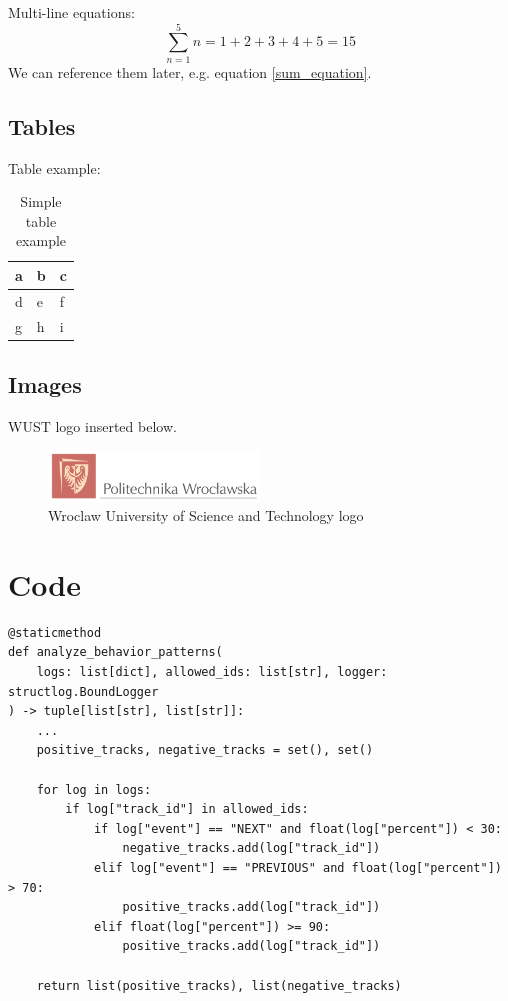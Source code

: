 \documentclass{pwrReport}
\begin{document}
        \noindent Multi-line equations:
        \begin{equation}
            \sum_{n=1}^{5} n = 1+2+3+4+5=15
            \label{sum_equation}
        \end{equation}
        \noindent We can reference them later, e.g. equation \ref{sum_equation}.

    \subsection{Tables}
        Table example:
        \begin{table}[h]
            \centering
            \begin{tabular}{|l|l|l|}
                \hline
                a & b & c \\ \hline
                d & e & f \\ \hline
                g & h & i \\ \hline
            \end{tabular}
            \caption{Simple table example}
        \end{table}

    \newpage
    \subsection{Images}
        WUST logo inserted below.
        \begin{figure}[!htbp]%
            \centering
            \includegraphics[width=0.5\textwidth]{images/logo_PWR_podpis.png}
            \caption{Wroclaw University of Science and Technology logo}%
            \label{fig:wust_logo}
        \end{figure}

    \section{Code}
\begin{lstlisting}
@staticmethod
def analyze_behavior_patterns(
    logs: list[dict], allowed_ids: list[str], logger: structlog.BoundLogger
) -> tuple[list[str], list[str]]:
    ...
    positive_tracks, negative_tracks = set(), set()

    for log in logs:
        if log["track_id"] in allowed_ids:
            if log["event"] == "NEXT" and float(log["percent"]) < 30:
                negative_tracks.add(log["track_id"])
            elif log["event"] == "PREVIOUS" and float(log["percent"]) > 70:
                positive_tracks.add(log["track_id"])
            elif float(log["percent"]) >= 90:
                positive_tracks.add(log["track_id"])

    return list(positive_tracks), list(negative_tracks)
\end{lstlisting}

    


\end{document}
